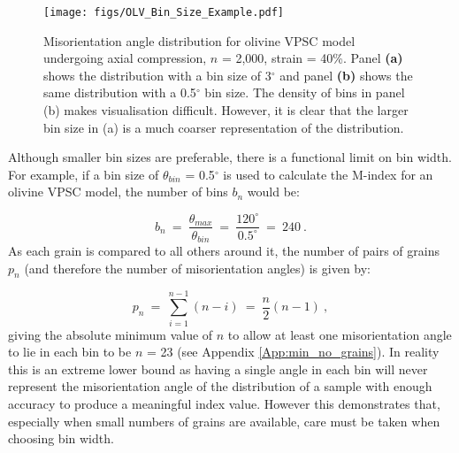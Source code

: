 \documentclass[a4paper,12pt,twoside]{report}
\numberwithin{equation}{chapter}
\begin{document}
\begin{figure}[h]
  \centering
    \texttt{[image: figs/OLV\_Bin\_Size\_Example.pdf]}
  \caption[Bin size example (olivine VPSC)]{Misorientation angle distribution for olivine VPSC model undergoing axial compression, $n$ = 2,000, strain = 40\%. Panel \textbf{(a)} shows the distribution with a bin size of 3$^\circ$ and panel \textbf{(b)} shows the same distribution with a 0.5$^\circ$ bin size. The density of bins in panel (b) makes visualisation difficult. However, it is clear that the larger bin size in (a) is a much coarser representation of the distribution.}
  \label{fig:OLV_bin_size_example}
\end{figure}  


Although smaller bin sizes are preferable, there is a functional limit on bin width. For example, if a bin size of $\theta_{bin}$ = 0.5$^\circ$ is used to calculate the M-index for an olivine VPSC model, the number of bins $b_n$ would be:

\begin{equation}
b_n\ =\ \frac{\theta_{max}}{\theta_{bin}}\ =\ \frac{120^\circ}{0.5^\circ}\ =\ 240\ . 
\end{equation}     
\noindent
As each grain is compared to all others around it, the number of pairs of grains $p_n$ (and therefore the number of misorientation angles) is given by:

\begin{equation}
p_n\ =\ \sum^{n-1}_{i=1}(n - i)\ =\ \frac{n}{2}(n-1)\ ,
\end{equation} 
\noindent
giving the absolute minimum value of $n$ to allow at least one misorientation angle to lie in each bin to be $n$ = 23 (see Appendix \ref{App:min_no_grains}). In reality this is an extreme lower bound as having a single angle in each bin will never represent the misorientation angle of the distribution of a sample with enough accuracy to produce a meaningful index value. However this demonstrates that, especially when small numbers of grains are available, care must be taken when choosing bin width. 
\end{document}
